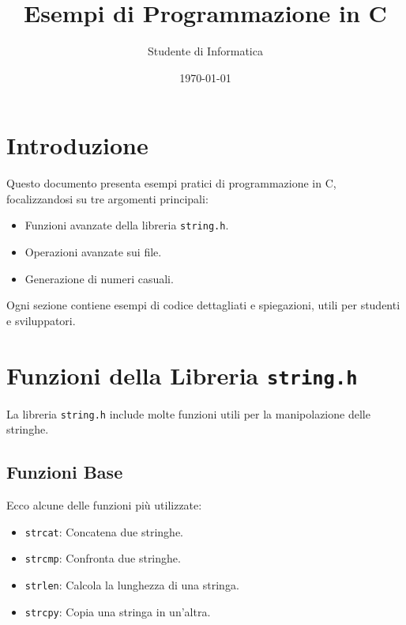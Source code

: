 \documentclass[a4paper,12pt]{article}
\title{\textbf{Esempi di Programmazione in C}}
\author{Studente di Informatica}
\date{\today}
\begin{document}
\maketitle

\tableofcontents
\newpage

\section{Introduzione}
Questo documento presenta esempi pratici di programmazione in C, focalizzandosi su tre argomenti principali:
\begin{itemize}
    \item Funzioni avanzate della libreria \texttt{string.h}.
    \item Operazioni avanzate sui file.
    \item Generazione di numeri casuali.
\end{itemize}

Ogni sezione contiene esempi di codice dettagliati e spiegazioni, utili per studenti e sviluppatori.

\section{Funzioni della Libreria \texttt{string.h}}
La libreria \texttt{string.h} include molte funzioni utili per la manipolazione delle stringhe.

\subsection{Funzioni Base}
Ecco alcune delle funzioni più utilizzate:
\begin{itemize}
    \item \texttt{strcat}: Concatena due stringhe.
    \item \texttt{strcmp}: Confronta due stringhe.
    \item \texttt{strlen}: Calcola la lunghezza di una stringa.
    \item \texttt{strcpy}: Copia una stringa in un'altra.
\end{itemize}
\end{document}
